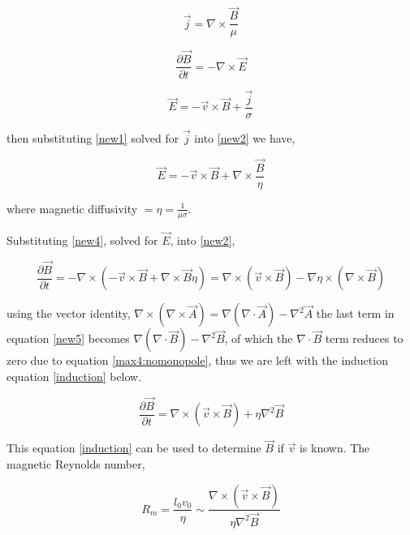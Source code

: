 \begin{equation}\label{new1}
\vec{j}=\nabla\times\frac{\vec{B}}{\mu}
\end{equation}

\begin{equation}\label{new2}
\frac{\partial \vec{B}}{\partial t} = - \nabla\times\vec{E}
\end{equation}

\begin{equation}\label{new3}
\vec{E}=-\vec{v}\times\vec{B}+\frac{\vec{j}}{\sigma}
\end{equation}

then substituting \ref{new1} solved for $\vec{j}$ into \ref{new2} we have,

\begin{equation}\label{new4} 
\vec{E}=-\vec{v}\times\vec{B}+\nabla\times\frac{\vec{B}}{\eta} 
\end{equation}

where magnetic diffusivity $=\eta =\frac{1}{\mu\sigma}$.

Substituting \ref{new4}, solved for $\vec{E}$, into \ref{new2},

\begin{equation}\label{new5}
\frac{\partial \vec{B}}{\partial t}=-\nabla\times(-\vec{v}\times\vec{B} + \nabla\times\vec{B}\eta)
                                   =\nabla\times(\vec{v}\times\vec{B})-\nabla\eta\times(\nabla\times\vec{B})
\end{equation}

using the vector identity, $\nabla\times(\nabla\times\vec{A})=\nabla(\nabla\cdot\vec{A})-\nabla^{2}\vec{A}$ the last term in equation \ref{new5} becomes $\nabla(\nabla\cdot\vec{B})-\nabla^{2}\vec{B}$, of which the $\nabla\cdot\vec{B}$ term reduces to zero due to equation \ref{max4:nomonopole}, thus we are left with the induction equation \ref{induction} below. 



\begin{equation}\label{induction}
\frac{\partial \vec{B}}{\partial t}=\nabla\times(\vec{v}\times\vec{B})+\eta\nabla^{2}\vec{B}  
\end{equation}

This equation \ref{induction} can be used to determine $\vec{B}$ if $\vec{v}$ is known. The magnetic Reynolds number,

\begin{equation}\label{reynolds}
R_{m} = \frac{l_{0}v_{0}}{\eta} \sim \frac{\nabla\times(\vec{v}\times\vec{B})}{\eta\nabla^{2}\vec{B}}
\end{equation}

